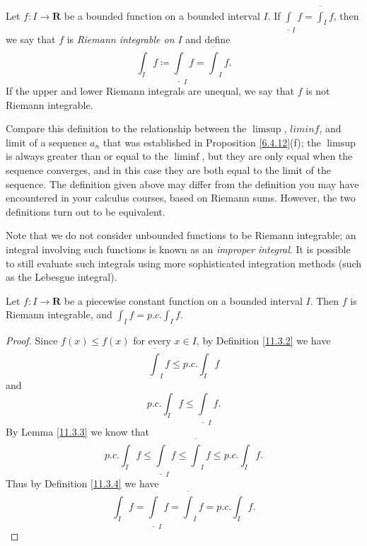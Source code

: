 \begin{definition}\label{11.3.4}
    Let \(f : I \to \mathbf{R}\) be a bounded function on a bounded interval \(I\).
    If \(\underline{\int}_I f = \overline{\int}_I f\), then we say that \(f\) is \emph{Riemann integrable on \(I\)} and define
    \[
        \int_I f \coloneqq \underline{\int}_I f = \overline{\int}_I f.
    \]
    If the upper and lower Riemann integrals are unequal, we say that \(f\) is not Riemann integrable.
\end{definition}

\begin{remark}\label{11.3.5}
    Compare this definition to the relationship between the \(\limsup\), \(liminf\), and limit of a sequence \(a_n\) that was established in Proposition \ref{6.4.12}(f);
    the \(\limsup\) is always greater than or equal to the \(\liminf\), but they are only equal when the sequence converges, and in this case they are both equal to the limit of the sequence.
    The definition given above may differ from the definition you may have encountered in your calculus courses, based on Riemann sums.
    However, the two definitions turn out to be equivalent.
\end{remark}

\begin{remark}\label{11.3.6}
    Note that we do not consider unbounded functions to be Riemann integrable;
    an integral involving such functions is known as an \emph{improper integral}.
    It is possible to still evaluate such integrals using more sophisticated integration methods (such as the Lebesgue integral).
\end{remark}

\begin{lemma}\label{11.3.7}
    Let \(f : I \to \mathbf{R}\) be a piecewise constant function on a bounded interval \(I\).
    Then \(f\) is Riemann integrable, and \(\int_I f = p.c. \int_I f\).
\end{lemma}

\begin{proof}
    Since \(f(x) \leq f(x)\) for every \(x \in I\), by Definition \ref{11.3.2} we have
    \[
        \overline{\int}_I f \leq p.c. \int_I f
    \]
    and
    \[
        p.c. \int_I f \leq \underline{\int}_I f.
    \]
    By Lemma \ref{11.3.3} we know that
    \[
        p.c. \int_I f \leq \underline{\int}_I f \leq \overline{\int}_I f \leq p.c. \int_I f.
    \]
    Thus by Definition \ref{11.3.4} we have
    \[
        \int_I f = \underline{\int}_I f = \overline{\int}_I f = p.c. \int_I f.
    \]
\end{proof}

